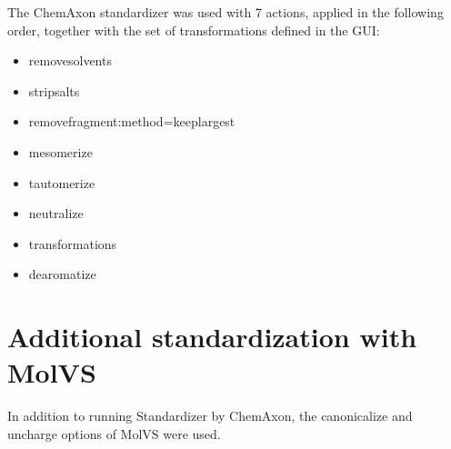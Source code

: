 \documentclass[
10pt, %
a4paper, %
oneside, %
]{article}
\begin{document}
The ChemAxon standardizer was used with 7 actions, applied in the following order, together with the set of transformations defined in the GUI:
\begin{itemize} 
\item removesolvents
\item stripsalts 
\item removefragment:method=keeplargest
\item mesomerize
\item tautomerize
\item neutralize
\item transformations
\item dearomatize
\end{itemize} 
	

\begin{landscape}

\end{landscape}

\section{Additional standardization with MolVS}

In addition to running Standardizer by ChemAxon, the canonicalize and uncharge options of MolVS were used.

\begin{landscape}

\end{landscape}
\end{document}
